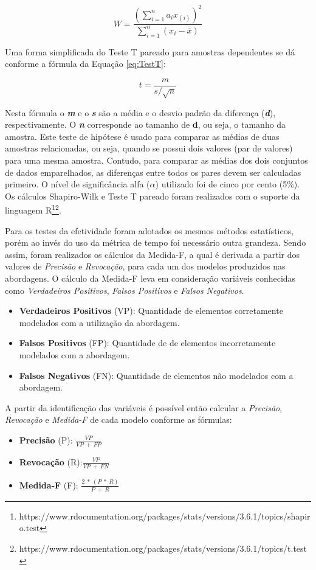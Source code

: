\begin{equation}
\label{eq:Shapiro}
W = \frac{\left(\sum_{i=1}^{n} a_ix_{(i)}\right)^2}{\sum_{i=1}^{n}\left(x_i -\overline{x}\right)} 
\end{equation}

Uma forma simplificada do Teste T pareado para amostras dependentes
se dá conforme a fórmula da Equação \ref{eq:TestT}:

\begin{equation}
\label{eq:TestT}
t = \frac{m}{s/\sqrt{n}} 
\end{equation}

Nesta fórmula o \textit{\textbf{m}} e o \textit{\textbf{s}} são a média e o desvio padrão da diferença (\textbf{\textit{d}}), respectivamente. 
O \textit{\textbf{n}} corresponde ao tamanho de \textbf{\textbf{d}}, ou seja, o tamanho da amostra.
Este teste de hipótese é usado para comparar as médias de duas amostras relacionadas, ou seja, quando se possui dois valores (par de valores) para uma mesma amostra. 
Contudo, para comparar as médias dos dois conjuntos de dados emparelhados, as diferenças entre todos os pares devem ser calculadas primeiro.
O nível de significância alfa ($\alpha$) utilizado foi de cinco por cento (5\%).
Os cálculos Shapiro-Wilk e Teste T pareado foram realizados com o suporte da linguagem R\footnote{https://www.rdocumentation.org/packages/stats/versions/3.6.1/topics/shapiro.test}\footnote{https://www.rdocumentation.org/packages/stats/versions/3.6.1/topics/t.test}.

Para os testes da efetividade foram adotados os mesmos métodos estatísticos, porém ao invés do uso da métrica de tempo foi necessário outra grandeza.
Sendo assim, foram realizados os cálculos da Medida-F, a qual é derivada a partir dos valores de \textit{Precisão} e \textit{Revocação}, para cada um dos modelos produzidos nas abordagens.
O cálculo da Medida-F leva em consideração variáveis conhecidas como \textit{Verdadeiros Positivos}, \textit{Falsos Positivos} e \textit{Falsos Negativos}.
\begin{itemize}
    \item \textbf{Verdadeiros Positivos} (VP): Quantidade de elementos corretamente modelados com a utilização da abordagem.
    \item \textbf{Falsos Positivos} (FP): Quantidade de de elementos incorretamente modelados
    com a abordagem.
    \item \textbf{Falsos Negativos} (FN): Quantidade de elementos não modelados com a abordagem.
\end{itemize}
A partir da identificação das variáveis é possível então calcular a \textit{Precisão}, \textit{Revocação} e \textit{Medida-F} de cada modelo conforme as fórmulas:
\begin{itemize}
    \item \textbf{Precisão} (P): $\frac{VP}{VP~+~FP}$ 
    \item \textbf{Revocação} (R):$\frac{VP}{VP~+~FN}$ 
    \item \textbf{Medida-F} (F): $\frac{2~*~(P~*~ R)}{P~+~R}$ 
\end{itemize}


